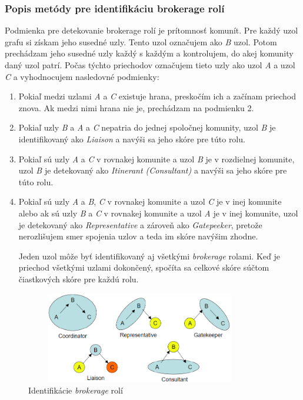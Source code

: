 \documentclass[slovak,master,public,dept460,male,cpdeclaration,oneside]{diploma}
\begin{document}
\subsubsection{Popis metódy pre identifikáciu brokerage rolí}
Podmienka pre detekovanie brokerage rolí je prítomnosť komunít. Pre každý uzol grafu si získam jeho susedné uzly. Tento uzol označujem ako \textit{B} uzol. Potom prechádzam jeho susedné uzly každý s každým a kontrolujem, do akej komunity daný uzol patrí. Počas týchto priechodov označujem tieto uzly ako uzol \textit{A} a uzol \textit{C} a vyhodnocujem nasledovné podmienky:

\begin{enumerate}
\item Pokiaľ medzi uzlami  \textit{A} a \textit{C} existuje hrana, preskočím ich a začínam priechod znova. Ak medzi nimi hrana nie je, prechádzam na podmienku 2.

\item Pokiaľ uzly \textit{B} a \textit{A} a \textit{C} nepatria do jednej spoločnej komunity, uzol \textit{B} je identifikovaný ako \textit{Liaison} a navýši sa jeho skóre pre túto rolu.

\item Pokiaľ sú uzly \textit{A} a \textit{C} v rovnakej komunite a uzol \textit{B} je v rozdielnej komunite, uzol \textit{B} je detekovaný ako \textit{Itinerant (Consultant)}  a navýši sa jeho skóre pre túto rolu.

\item Pokiaľ sú uzly \textit{A} a \textit{B}, \textit{C} v rovnakej komunite a uzol \textit{C} je v inej komunite alebo ak sú uzly \textit{B} a \textit{C} v rovnakej komunite a uzol \textit{A} je v inej komunite, uzol je detekovaný ako \textit{Representative} a zároveň ako \textit{Gatepeeker}, pretože nerozlišujem smer spojenia uzlov a teda im skóre navýšim zhodne.


Jeden uzol môže byť identifikovaný aj všetkými \textit{brokerage} rolami. Keď je priechod všetkými uzlami dokončený, spočíta sa celkové skóre súčtom čiastkových skóre pre každú rolu.

\end{enumerate}

\begin{figure}[H]
\centering
\includegraphics[width=10cm,height=4cm]{figures/brokerage_algoritmus}
\caption{Identifikácie \textit{brokerage} rolí \cite{brokerage_borgatti}}
\end{figure}
\end{document}
